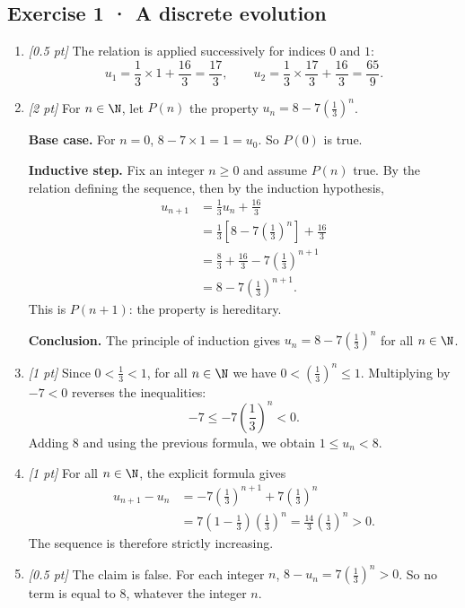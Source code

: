 \subsection*{Exercise 1 · A discrete evolution}\begin{enumerate}

\item \textit{[0.5 pt]} The relation is applied successively for indices $0$ and $1$:\[u_1=\frac{1}{3}\times 1+\frac{16}{3}=\frac{17}{3},\qquad u_2=\frac{1}{3}\times \frac{17}{3}+\frac{16}{3}=\frac{65}{9}.\]

\item \textit{[2 pt]} For $n\in\N$, let $P(n)$ the property $u_n=8-7\left(\frac{1}{3}\right)^n$.
\par\smallskip\textbf{Base case.} For $n=0$, $8-7\times1=1=u_0$. So $P(0)$ is true.
\par\smallskip\textbf{Inductive step.} Fix an integer $n\ge0$ and assume $P(n)$ true. By the relation defining the sequence, then by the induction hypothesis,
\[\begin{aligned}u_{n+1}&=\frac{1}{3}u_n+\frac{16}{3}\\
&=\frac{1}{3}\left[8-7\left(\frac{1}{3}\right)^n\right]+\frac{16}{3}\\
&=\frac{8}{3}+\frac{16}{3}-7\left(\frac{1}{3}\right)^{n+1}\\
&=8-7\left(\frac{1}{3}\right)^{n+1}.
\end{aligned}\]
This is $P(n+1)$: the property is hereditary.
\par\smallskip\textbf{Conclusion.} The principle of induction gives $u_n=8-7\left(\frac{1}{3}\right)^n$ for all $n\in\N$.

\item \textit{[1 pt]} Since $0<\frac{1}{3}<1$, for all $n\in\N$ we have $0<(\frac{1}{3})^n\le1$. Multiplying by $-7<0$ reverses the inequalities:
\[-7\le-7(\frac{1}{3})^n<0.\]
Adding $8$ and using the previous formula, we obtain $1\le u_n<8$.

\item \textit{[1 pt]} For all $n\in\N$, the explicit formula gives
\[\begin{aligned}u_{n+1}-u_n&=-7(\frac{1}{3})^{n+1}+7(\frac{1}{3})^n\\&=7(1-\frac{1}{3})(\frac{1}{3})^n=\frac{14}{3}(\frac{1}{3})^n>0.\end{aligned}\]
The sequence is therefore strictly increasing.

\item \textit{[0.5 pt]} The claim is false. For each integer $n$, $8-u_n=7(\frac{1}{3})^n>0$. So no term is equal to $8$, whatever the integer $n$.

\end{enumerate}

